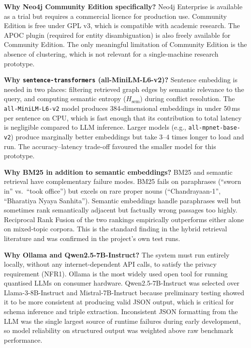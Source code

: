 \textbf{Why Neo4j Community Edition specifically?}
Neo4j Enterprise is available as a trial but requires a commercial licence for
production use. Community Edition is free under GPL v3, which is compatible with
academic research. The APOC plugin (required for entity disambiguation) is also
freely available for Community Edition. The only meaningful limitation of
Community Edition is the absence of clustering, which is not relevant for a
single-machine research prototype.

\textbf{Why \texttt{sentence-transformers} (all-MiniLM-L6-v2)?}
Sentence embedding is needed in two places: filtering retrieved graph edges by
semantic relevance to the query, and computing semantic entropy ($H_{\text{sem}}$)
during conflict resolution. The \texttt{all-MiniLM-L6-v2} model produces 384-dimensional
embeddings in under 50\,ms per sentence on CPU, which is fast enough that its
contribution to total latency is negligible compared to LLM inference. Larger
models (e.g., \texttt{all-mpnet-base-v2}) produce marginally better embeddings
but take 3--4 times longer to load and run. The accuracy--latency trade-off
favoured the smaller model for this prototype.

\textbf{Why BM25 in addition to semantic embeddings?}
BM25 and semantic retrieval have complementary failure modes. BM25 fails on
paraphrases (``sworn in'' vs.\ ``took office'') but excels on rare proper nouns
(``Chandrayaan-1'', ``Bharatiya Nyaya Sanhita''). Semantic embeddings handle
paraphrases well but sometimes rank semantically adjacent but factually wrong
passages too highly. Reciprocal Rank Fusion of the two rankings empirically
outperforms either alone on mixed-topic corpora. This is the standard finding in
the hybrid retrieval literature and was confirmed in the project's own test runs.

\textbf{Why Ollama and Qwen2.5-7B-Instruct?}
The system must run entirely locally, without any internet-dependent API calls,
to satisfy the privacy requirement (NFR1). Ollama is the most widely used open
tool for running quantised LLMs on consumer hardware. Qwen2.5-7B-Instruct was
selected over Llama-3-8B-Instruct and Mistral-7B-Instruct because preliminary
testing showed it to be more consistent at producing valid JSON output, which is
critical for schema inference and triple extraction. Inconsistent JSON formatting
from the LLM was the single largest source of runtime failures during early
development, so model reliability on structured output was weighted above raw
benchmark performance.

